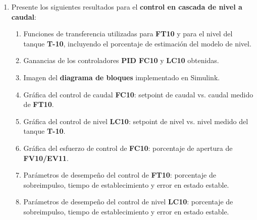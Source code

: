 \begin{enumerate}[label=\arabic*)]
    \item Presente los siguientes resultados para el \textbf{control en cascada de nivel a caudal}:
    \begin{enumerate}[label=\alph*.]
        \item Funciones de transferencia utilizadas para \textbf{FT10} y para el nivel del tanque \textbf{T-10}, incluyendo el porcentaje de estimación del modelo de nivel.
        \item Ganancias de los controladores \textbf{PID FC10} y \textbf{LC10} obtenidas.
        \item Imagen del \textbf{diagrama de bloques} implementado en Simulink.
        \item Gráfica del control de caudal \textbf{FC10}: setpoint de caudal vs. caudal medido de \textbf{FT10}.
        \item Gráfica del control de nivel \textbf{LC10}: setpoint de nivel vs. nivel medido del tanque \textbf{T-10}.
        \item Gráfica del esfuerzo de control de \textbf{FC10}: porcentaje de apertura de \textbf{FV10/EV11}.
        \item Parámetros de desempeño del control de \textbf{FT10}: porcentaje de sobreimpulso, tiempo de establecimiento y error en estado estable.
        \item Parámetros de desempeño del control de nivel \textbf{LC10}: porcentaje de sobreimpulso, tiempo de establecimiento y error en estado estable.
    \end{enumerate}
\end{enumerate}
